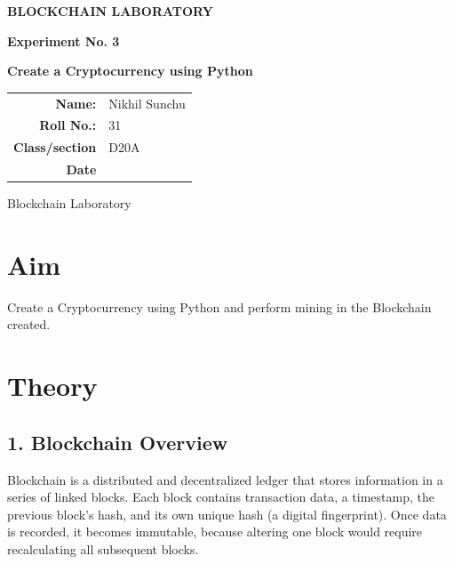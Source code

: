 \documentclass[12pt,a4paper]{article}
\begin{document}
\begin{titlepage}
    \centering
    \vspace*{1.5cm}

    {\Large\bfseries BLOCKCHAIN LABORATORY\par}
    \vspace{1.2cm}

    {\large\bfseries Experiment No. 3\par}
    \vspace{0.8cm}

    {\LARGE\bfseries Create a Cryptocurrency using Python\par}

    \vspace{1cm}

    \begin{tabular}{rl}
    \textbf{Name:} & Nikhil Sunchu \\[0.6cm]
    \textbf{Roll No.:} & 31 \\[0.6cm]
    \textbf{Class/section} & D20A \\[0.6cm]
    \textbf{Date}& \hrulefill \\[0.6cm]
    \end{tabular}

    \vfill
    {\large Blockchain Laboratory\par}
\end{titlepage}

\section{Aim}
Create a Cryptocurrency using Python and perform mining in the Blockchain created.

\section{Theory}

\subsection{1. Blockchain Overview}
Blockchain is a distributed and decentralized ledger that stores information in a series of linked blocks. Each block contains transaction data, a timestamp, the previous block's hash, and its own unique hash (a digital fingerprint). Once data is recorded, it becomes immutable, because altering one block would require recalculating all subsequent blocks.
\end{document}
